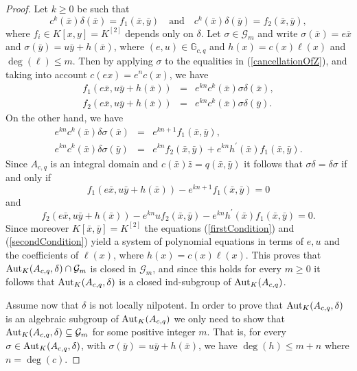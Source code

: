 \documentclass{article}
\newcommand \G {\mathbb{G}}
\renewcommand \a {A}
\renewcommand \k {K}
\newcommand \auto {{\rm Aut}}
\begin{document}
{\begin{proof}
	\medskip Let $k\geq 0$ be such that \begin{equation}\label{cancellationOfZ}c^{k}(\bar{x})\delta(\bar{x})=f_1(\bar{x},\bar{y}) \quad \text{and} \quad c^{k}(\bar{x})\delta(\bar{y})=f_2(\bar{x},\bar{y}),\end{equation} where $f_i\in \k[x,y]=K^{[2]}$ depends only on $\delta$. Let $\sigma\in\mathcal{G}_m$ and write $\sigma(\bar{x})=e\bar{x}$ and $\sigma(\bar{y})=u\bar{y}+h(\bar{x})$, where $(e,u)\in\G_{c,q}$ and $h(x)=c(x)\ell(x)$ and $\deg(\ell)\leq m$. Then by applying $\sigma$ to the equalities in (\ref{cancellationOfZ}), and taking into account $c(ex)=e^nc(x)$, we have $$\begin{array}{ccc}f_1(e\bar{x},u\bar{y}+h(\bar{x}))&=&
		e^{kn}c^k(\bar{x})\sigma\delta(\bar{x}),\\
		f_2(e\bar{x},u\bar{y}+h(\bar{x}))&=&e^{kn}c^k(\bar{x})\sigma\delta(\bar{y}).\end{array}$$
	On the other hand, we have
	$$\begin{array}{ccc}
		e^{kn}c^k(\bar{x})\delta\sigma(\bar{x})&=&e^{kn+1}f_1(\bar{x},\bar{y}),\\
		e^{kn}c^k(\bar{x})\delta\sigma(\bar{y})&=&e^{kn}f_2(\bar{x},\bar{y})+e^{kn}h^{\prime}(\bar{x})f_1(\bar{x},\bar{y}).
	\end{array}$$
	Since $\a_{c,q}$ is an integral domain and $c(\bar{x})\bar{z}=q(\bar{x},\bar{y})$ it follows that $\sigma\delta=\delta\sigma$ if and only if
	\begin{equation}\label{firstCondition}f_1(e\bar{x},u\bar{y}+h(\bar{x}))-e^{kn+1}f_1(\bar{x},\bar{y})=0
	\end{equation}
	and
	\begin{equation}\label{secondCondition}f_2(e\bar{x},u\bar{y}+h(\bar{x}))-e^{kn}uf_2(\bar{x},\bar{y})-e^{kn}h^{\prime}(\bar{x})f_1(\bar{x},\bar{y})=0.
	\end{equation}
	Since moreover $\k[\bar{x},\bar{y}]=\k^{[2]}$ the equations (\ref{firstCondition}) and (\ref{secondCondition}) yield a system of polynomial equations in terms of $e,u$ and the coefficients of $\ell(x)$, where $h(x)=c(x)\ell(x)$. This proves that $\auto_{\k}(\a_{c,q},\delta)\cap \mathcal{G}_m$ is closed in $\mathcal{G}_m$, and since this holds for every $m\geq 0$ it follows that $\auto_{\k}(\a_{c,q},\delta)$ is a closed ind-subgroup of $\auto_{\k}(\a_{c,q})$.
	
	\medskip Assume now that $\delta$ is not locally nilpotent. In order to prove that $\auto_{\k}(\a_{c,q},\delta)$ is an algebraic subgroup of $\auto_{\k}(\a_{c,q})$ we only need to show that $\auto_{\k}(\a_{c,q},\delta)\subseteq \mathcal{G}_m$ for some positive integer $m$. That is, for every $\sigma\in\auto_{\k}(\a_{c,q},\delta)$, with $\sigma(\bar{y})=u\bar{y}+h(\bar{x})$, we have $\deg(h)\leq m+n$ where $n=\deg(c)$.
	

\end{proof}}
\end{document}
